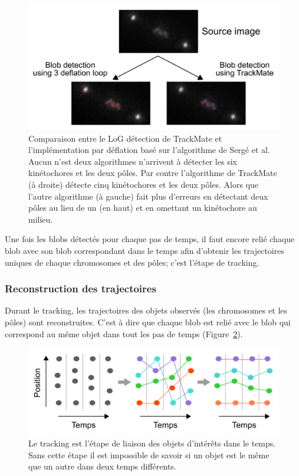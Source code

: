 \documentclass[12pt,a4paper,twoside,openright]{book}
\begin{document}
\begin{figure}[htbp]
\centering
\includegraphics{figures/results/imaging/compare.png}
\caption[Principe de l'algorithme de détection de blob par déflation]{\label{fig:compare}Comparaison
entre le LoG détection de TrackMate et l'implémentation par déflation
basé sur l'algorithme de Sergé et al. Aucun n'est deux algorithmes
n'arrivent à détecter les six kinétochores et les deux pôles. Par contre
l'algorithme de TrackMate (à droite) détecte cinq kinétochores et les
deux pôles. Alors que l'autre algorithme (à gauche) fait plus d'erreurs
en détectant deux pôles au lieu de un (en haut) et en omettant un
kinétochore au milieu.}
\end{figure}

Une fois les blobs détectés pour chaque pas de temps, il faut encore
relié chaque blob avec son blob correspondant dans le temps afin
d'obtenir les trajectoires uniques de chaque chromosomes et des pôles;
c'est l'étape de tracking.

\subsubsection{Reconstruction des
trajectoires}\label{reconstruction-des-trajectoires}

Durant le tracking, les trajectoires des objets observés (les
chromosomes et les pôles) sont reconstruites. C'est à dire que chaque
blob est relié avec le blob qui correspond au même objet dans tout les
pas de temps (Figure~\ref{fig:whatistracking}).

\begin{figure}[htbp]
\centering
\includegraphics{figures/results/imaging/whatistracking.png}
\caption[Le tracking est l'étape de liaison des objets d'intérêts dans le temps]{\label{fig:whatistracking}Le
tracking est l'étape de liaison des objets d'intérêts dans le temps.
Sans cette étape il est impossible de savoir si un objet est le même que
un autre dans deux temps différents.}
\end{figure}
\end{document}
